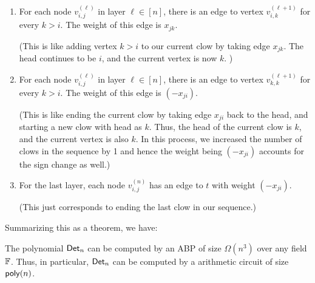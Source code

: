 \begin{enumerate}
\item For each node $v_{i,j}^{(\ell)}$ in layer $\ell \in [n]$, there is an edge to vertex $v_{i,k}^{(\ell+1)}$ for every $k > i$. The weight of this edge is $x_{jk}$. 

(This is like adding vertex $k > i$ to our current clow by taking edge $x_{jk}$. The head continues to be $i$, and the current vertex is now $k$. )
\item For each node $v_{i,j}^{(\ell)}$ in layer $\ell \in [n]$, there is an edge to vertex $v_{k,k}^{(\ell+1)}$ for every $k > i$. The weight of this edge is $(-x_{ji})$. 

(This is like ending the current clow by taking edge $x_{ji}$ back to the head, and starting a new clow with head as $k$. Thus, the head of the current clow is $k$, and the current vertex is also $k$. In this process, we increased the number of clows in the sequence by 1 and hence the weight being $(-x_{ji})$ accounts for the sign change as well.)

\item For the last layer, each node $v_{i,j}^{(n)}$ has an edge to $t$ with weight $(-x_{ji})$. 

(This just corresponds to ending the last clow in our sequence.)
\end{enumerate}


\noindent
Summarizing this as a theorem, we have:

\begin{theorem}[\cite{mv97}]\label{thm:det-abp}
The polynomial $\mathsf{Det}_n$ can be computed by an ABP of size $\Omega(n^3)$ over any field $\mathbb{F}$. Thus, in particular, $\mathsf{Det}_n$ can be computed by a arithmetic circuit of size $\mathsf{poly}(n)$. 
\end{theorem}


